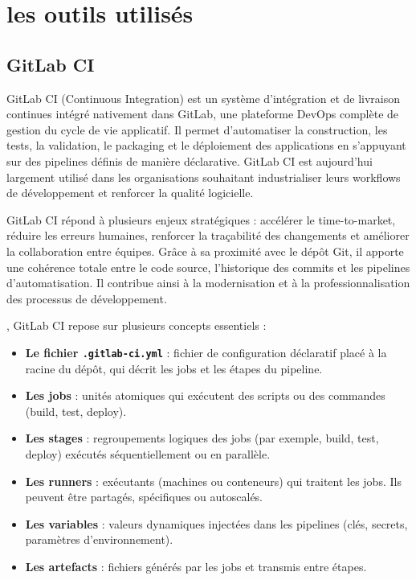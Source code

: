 \section{les outils utilisés}
\subsection{GitLab CI}

GitLab CI (Continuous Integration) est un système d’intégration et de livraison continues intégré nativement dans GitLab, une plateforme DevOps complète de gestion du cycle de vie applicatif. Il permet d’automatiser la construction, les tests, la validation, le packaging et le déploiement des applications en s’appuyant sur des pipelines définis de manière déclarative. GitLab CI est aujourd’hui largement utilisé dans les organisations souhaitant industrialiser leurs workflows de développement et renforcer la qualité logicielle.

GitLab CI répond à plusieurs enjeux stratégiques  : accélérer le time-to-market, réduire les erreurs humaines, renforcer la traçabilité des changements et améliorer la collaboration entre équipes. Grâce à sa proximité avec le dépôt Git, il apporte une cohérence totale entre le code source, l’historique des commits et les pipelines d’automatisation. Il contribue ainsi à la modernisation et à la professionnalisation des processus de développement.

, GitLab CI repose sur plusieurs concepts essentiels  :
\begin{itemize}
	\item \textbf{Le fichier \texttt{.gitlab-ci.yml}}  : fichier de configuration déclaratif placé à la racine du dépôt, qui décrit les jobs et les étapes du pipeline.
	\item \textbf{Les jobs}  : unités atomiques qui exécutent des scripts ou des commandes (build, test, deploy).
	\item \textbf{Les stages}  : regroupements logiques des jobs (par exemple, build, test, deploy) exécutés séquentiellement ou en parallèle.
	\item \textbf{Les runners}  : exécutants (machines ou conteneurs) qui traitent les jobs. Ils peuvent être partagés, spécifiques ou autoscalés.
	\item \textbf{Les variables}  : valeurs dynamiques injectées dans les pipelines (clés, secrets, paramètres d’environnement).
	\item \textbf{Les artefacts}  : fichiers générés par les jobs et transmis entre étapes.
\end{itemize}

